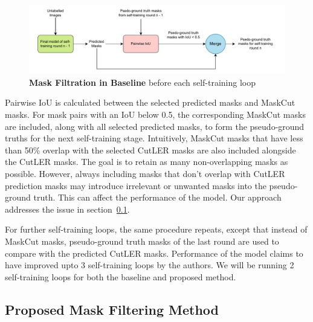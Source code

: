 \begin{figure}
	\centering
	\includegraphics[width=1\textwidth]{Images/main/baseline_mask_filtration.pdf}
	\caption[\textbf{Mask Filtration in Baseline}]{\textbf{Mask Filtration in Baseline} before each self-training loop}
	\label{fig:baseline_mask_filtration}
\end{figure}

Pairwise IoU is calculated between the selected predicted masks and MaskCut masks. For mask pairs with an IoU below 0.5, the corresponding MaskCut masks are included, along with all selected predicted masks, to form the pseudo-ground truths for the next self-training stage. Intuitively, MaskCut masks that have less than 50\% overlap with the selected CutLER masks are also included alongside the CutLER masks. The goal is to retain as many non-overlapping masks as possible. However, always including masks that don't overlap with CutLER prediction masks may introduce irrelevant or unwanted masks into the pseudo-ground truth. This can affect the performance of the model. Our approach addresses the issue in section~\ref{section:proposed_method}.

For further self-training loops, the same procedure repeats, except that instead of MaskCut masks, pseudo-ground truth masks of the last round are used to compare with the predicted CutLER masks. Performance of the model claims to have improved upto 3 self-training loops by the authors. We will be running 2 self-training loops for both the baseline and proposed method.

\subsection{Proposed Mask Filtering Method}
\label{section:proposed_method}

